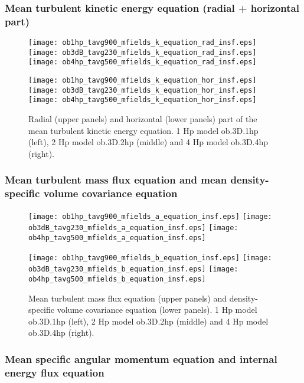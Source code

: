 \documentclass[10pt,paper=a4]{report}
\begin{document}
\subsubsection{Mean turbulent kinetic energy equation (radial + horizontal part)}

\begin{figure}[!h]
\centerline{
\texttt{[image: ob1hp\_tavg900\_mfields\_k\_equation\_rad\_insf.eps]}
\texttt{[image: ob3dB\_tavg230\_mfields\_k\_equation\_rad\_insf.eps]}
\texttt{[image: ob4hp\_tavg500\_mfields\_k\_equation\_rad\_insf.eps]}}

\centerline{
\texttt{[image: ob1hp\_tavg900\_mfields\_k\_equation\_hor\_insf.eps]}
\texttt{[image: ob3dB\_tavg230\_mfields\_k\_equation\_hor\_insf.eps]}
\texttt{[image: ob4hp\_tavg500\_mfields\_k\_equation\_hor\_insf.eps]}}
\caption{Radial (upper panels) and horizontal (lower panels) part of the mean turbulent kinetic energy equation. 1 Hp model {\sf ob.3D.1hp} (left), 2 Hp model {\sf ob.3D.2hp} (middle) and 4 Hp model {\sf ob.3D.4hp} (right).}
\end{figure}

\newpage

\subsubsection{Mean turbulent mass flux equation and mean density-specific volume covariance equation}

\begin{figure}[!h]
\centerline{
\texttt{[image: ob1hp\_tavg900\_mfields\_a\_equation\_insf.eps]}
\texttt{[image: ob3dB\_tavg230\_mfields\_a\_equation\_insf.eps]}
\texttt{[image: ob4hp\_tavg500\_mfields\_a\_equation\_insf.eps]}}

\centerline{
\texttt{[image: ob1hp\_tavg900\_mfields\_b\_equation\_insf.eps]}
\texttt{[image: ob3dB\_tavg230\_mfields\_b\_equation\_insf.eps]}
\texttt{[image: ob4hp\_tavg500\_mfields\_b\_equation\_insf.eps]}}
\caption{Mean turbulent mass flux equation (upper panels) and density-specific volume covariance equation (lower panels). 1 Hp model {\sf ob.3D.1hp} (left), 2 Hp model {\sf ob.3D.2hp} (middle) and 4 Hp model {\sf ob.3D.4hp} (right).}
\end{figure}

\newpage

\subsubsection{Mean specific angular momentum equation and internal energy flux equation}
\end{document}

